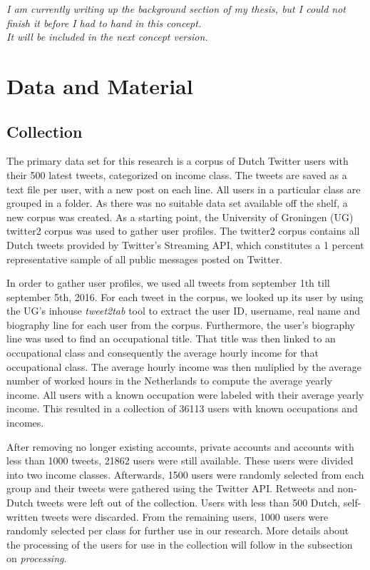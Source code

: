 \documentclass[
10pt, %
a4paper, %
oneside, %
headinclude,footinclude, %
] {book}%
\begin{document}
\textit{I am currently writing up the background section of my thesis, but I could not finish it before I had to hand in this concept.\\It will be included in the next concept version.}






\chapter{Data and Material}


\section{Collection} 

The primary data set for this research is a corpus of Dutch Twitter users with their 500 latest tweets, categorized on income class. The tweets are saved as a text file per user, with a new post on each line. All users in a particular class are grouped in a folder. As there was no suitable data set available off the shelf, a new corpus was created. As a starting point, the University of Groningen (UG) twitter2 corpus was used to gather user profiles. The twitter2 corpus contains all Dutch tweets provided by Twitter's Streaming API, which constitutes a 1 percent representative sample of all public messages posted on Twitter. 

In order to gather user profiles, we used all tweets from september 1th till september 5th, 2016. For each tweet in the corpus, we looked up its user by using the UG's inhouse \textit{tweet2tab} tool to extract the user ID, username, real name and biography line for each user from the corpus. Furthermore, the user's biography line was used to find an occupational title. That title was then linked to an occupational class and consequently the average hourly income for that occupational class. The average hourly income was then muliplied by the average number of worked hours in the Netherlands to compute the average yearly income. All users with a known occupation were labeled with their average yearly income. This resulted in a collection of 36113 users with known occupations and incomes.

After removing no longer existing accounts, private accounts and accounts with less than 1000 tweets, 21862 users were still available. These users were divided into two income classes. Afterwards, 1500 users were randomly selected from each group and their tweets were gathered using the Twitter API. Retweets and non-Dutch tweets were left out of the collection. Users with less than 500 Dutch, self-written tweets were discarded. From the remaining users, 1000 users were randomly selected per class for further use in our research. More details about the processing of the users for use in the collection will follow in the subsection on \textit{processing}.
\end{document}
